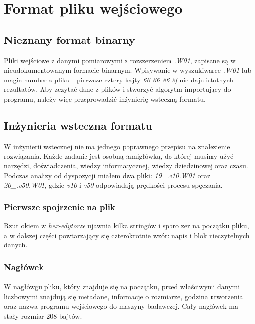 \documentclass[12pt]{report}
\begin{document}
	\section{Format pliku wejściowego}
	\subsection{Nieznany format binarny}
	Pliki wejściowe z danymi pomiarowymi z rozszerzeniem \textit{.W01}, zapisane są w nieudokumentowanym formacie binarnym. Wpisywanie w wyszukiwarce \textit{.W01} lub magic number z pliku - pierwsze cztery bajty \textit{66 66 86 3f} nie daje istotnych rezultatów. Aby zczytać dane z plików i stworzyć algorytm importujący do programu, należy więc przeprowadzić inżynierię wsteczną formatu.
	
	\subsection{Inżynieria wsteczna formatu}
	W inżynierii wstecznej nie ma jednego poprawnego przepisu na znalezienie rozwiązania. Każde zadanie jest osobną łamigłówką, do której musimy użyć narzędzi, doświadczenia, wiedzy informatycznej, wiedzy dziedzinowej oraz czasu.
	Podczas analizy od dyspozycji miałem dwa pliki: \textit{19\_.v10.W01} oraz \textit{20\_.v50.W01}, gdzie \textit{v10} i \textit{v50} odpowiadają prędkości procesu spęczania.
	
	\subsubsection{Pierwsze spojrzenie na plik}
	Rzut okiem w \textit{hex-edytorze} ujawnia kilka stringów i sporo zer na początku pliku, a w dalszej części powtarzający się czterokrotnie wzór: napis i blok nieczytelnych danych.
	
	
	\subsubsection{Nagłówek}
	\paragraph{}
	W nagłówgu pliku, który znajduje się na początku, przed właściwymi danymi liczbowymi znajdują się metadane, informacje o rozmiarze, godzina utworzenia oraz nazwa programu wejściowego do maszyny badawczej. Cały nagłówek ma stały rozmiar 208 bajtów.
	
\end{document}
